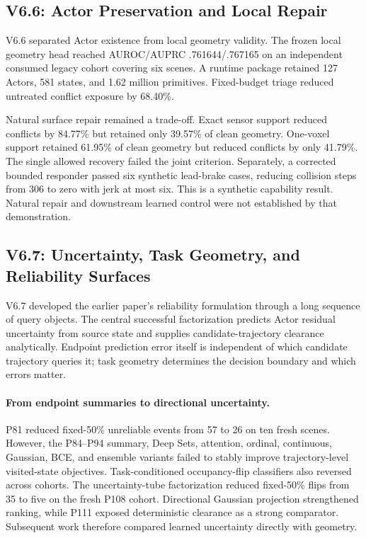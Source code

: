 \subsection{V6.6: Actor Preservation and Local Repair}

V6.6 separated Actor existence from local geometry validity.
The frozen local geometry head reached AUROC/AUPRC .761644/.767165 on an independent consumed
legacy cohort covering six scenes. A runtime package retained 127 Actors, 581 states, and 1.62 million
primitives. Fixed-budget triage reduced untreated conflict exposure by 68.40\%.

Natural surface repair remained a trade-off.
Exact sensor support reduced conflicts by 84.77\% but retained only 39.57\% of clean geometry.
One-voxel support retained 61.95\% of clean geometry but reduced conflicts by only 41.79\%.
The single allowed recovery failed the joint criterion.
Separately, a corrected bounded responder passed six synthetic lead-brake cases, reducing collision
steps from 306 to zero with jerk at most six. This is a synthetic capability result.
Natural repair and downstream learned control were not established by that demonstration.

\subsection{V6.7: Uncertainty, Task Geometry, and Reliability Surfaces}

V6.7 developed the earlier paper's reliability formulation through a long sequence of query objects.
The central successful factorization predicts Actor residual uncertainty from source state and supplies
candidate-trajectory clearance analytically.
Endpoint prediction error itself is independent of which candidate trajectory queries it; task geometry
determines the decision boundary and which errors matter.

\paragraph{From endpoint summaries to directional uncertainty.}
P81 reduced fixed-50\% unreliable events from 57 to 26 on ten fresh scenes.
However, the P84--P94 summary, Deep Sets, attention, ordinal, continuous, Gaussian, BCE, and ensemble
variants failed to stably improve trajectory-level visited-state objectives.
Task-conditioned occupancy-flip classifiers also reversed across cohorts.
The uncertainty-tube factorization reduced fixed-50\% flips from 35 to five on the fresh P108 cohort.
Directional Gaussian projection strengthened ranking, while P111 exposed deterministic clearance as a strong
comparator. Subsequent work therefore compared learned uncertainty directly with geometry.


